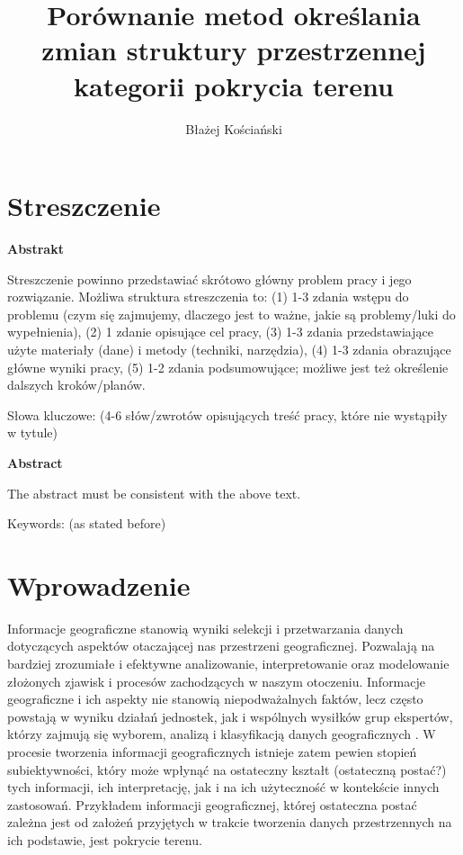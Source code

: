 \documentclass{amuthesis}
\author{Błażej Kościański}
\title{Porównanie metod określania zmian struktury przestrzennej
kategorii pokrycia terenu}
\begin{document}

\titlepage


\hypertarget{streszczenie}{%
\chapter*{Streszczenie}\label{streszczenie}}


\textbf{Abstrakt}

Streszczenie powinno przedstawiać skrótowo główny problem pracy i jego
rozwiązanie. Możliwa struktura streszczenia to: (1) 1-3 zdania wstępu do
problemu (czym się zajmujemy, dlaczego jest to ważne, jakie są
problemy/luki do wypełnienia), (2) 1 zdanie opisujące cel pracy, (3) 1-3
zdania przedstawiające użyte materiały (dane) i metody (techniki,
narzędzia), (4) 1-3 zdania obrazujące główne wyniki pracy, (5) 1-2
zdania podsumowujące; możliwe jest też określenie dalszych
kroków/planów.

Słowa kluczowe: (4-6 słów/zwrotów opisujących treść pracy, które nie
wystąpiły w tytule)

\textbf{Abstract}

The abstract must be consistent with the above text.

Keywords: (as stated before)

\newpage

\sf\tighttoc\doublespacing


\hypertarget{sec-wprowadzenie}{%
\chapter{Wprowadzenie}\label{sec-wprowadzenie}}

Informacje geograficzne stanowią wyniki selekcji i przetwarzania danych
dotyczących aspektów otaczającej nas przestrzeni geograficznej.
Pozwalają na bardziej zrozumiałe i efektywne analizowanie,
interpretowanie oraz modelowanie złożonych zjawisk i procesów
zachodzących w naszym otoczeniu. Informacje geograficzne i ich aspekty
nie stanowią niepodważalnych faktów, lecz często powstają w wyniku
działań jednostek, jak i wspólnych wysiłków grup ekspertów, którzy
zajmują się wyborem, analizą i klasyfikacją danych geograficznych
\autocite{WhatIsLandCover}. W procesie tworzenia informacji
geograficznych istnieje zatem pewien stopień subiektywności, który może
wpłynąć na ostateczny kształt (ostateczną postać?) tych informacji, ich
interpretację, jak i na ich użyteczność w kontekście innych zastosowań.
Przykładem informacji geograficznej, której ostateczna postać zależna
jest od założeń przyjętych w trakcie tworzenia danych przestrzennych na
ich podstawie, jest pokrycie terenu.
\end{document}
